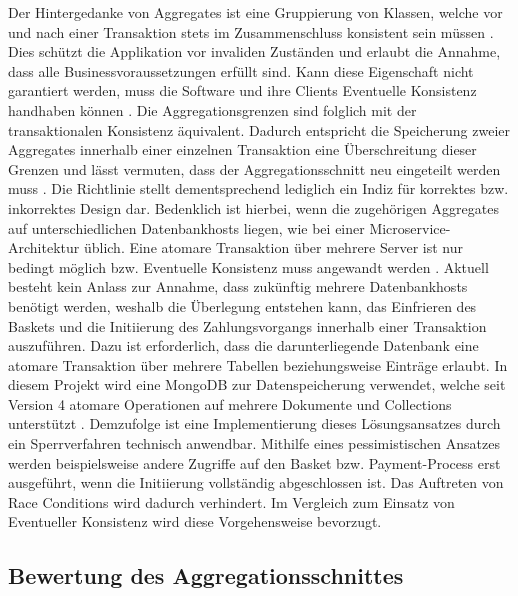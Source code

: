 Der Hintergedanke von Aggregates ist eine Gruppierung von Klassen, welche vor und nach einer Transaktion stets im Zusammenschluss konsistent sein müssen \cite[S. 128f.]{Evans.2011}. Dies schützt die Applikation vor invaliden Zuständen und erlaubt die Annahme, dass alle Businessvoraussetzungen erfüllt sind. Kann diese Eigenschaft nicht garantiert werden, muss die Software und ihre Clients Eventuelle Konsistenz handhaben können \cite[S. 364]{Vernon.2015}. Die Aggregationsgrenzen sind folglich mit der transaktionalen Konsistenz äquivalent. Dadurch entspricht die Speicherung zweier Aggregates innerhalb einer einzelnen Transaktion eine Überschreitung dieser Grenzen und lässt vermuten, dass der Aggregationsschnitt neu eingeteilt werden muss \cite[S. 358f.]{Vernon.2015}. Die Richtlinie stellt dementsprechend lediglich ein Indiz für korrektes bzw. inkorrektes Design dar. Bedenklich ist hierbei, wenn die zugehörigen Aggregates auf unterschiedlichen Datenbankhosts liegen, wie bei einer Microservice-Architektur üblich. Eine atomare Transaktion über mehrere Server ist nur bedingt möglich bzw. Eventuelle Konsistenz muss angewandt werden \cite{Fowler.2014}. Aktuell besteht kein Anlass zur Annahme, dass zukünftig mehrere Datenbankhosts benötigt werden, weshalb die Überlegung entstehen kann, das Einfrieren des Baskets und die Initiierung des Zahlungsvorgangs innerhalb einer Transaktion auszuführen. Dazu ist erforderlich, dass die darunterliegende Datenbank eine atomare Transaktion über mehrere Tabellen beziehungsweise Einträge erlaubt. In diesem Projekt wird eine MongoDB zur Datenspeicherung verwendet, welche seit Version 4 atomare Operationen auf mehrere Dokumente und Collections unterstützt \cite{mongodb.atomicity}. Demzufolge ist eine Implementierung dieses Lösungsansatzes durch ein Sperrverfahren technisch anwendbar. Mithilfe eines pessimistischen Ansatzes werden beispielsweise andere Zugriffe auf den Basket bzw. Payment-Process erst ausgeführt, wenn die Initiierung vollständig abgeschlossen ist. Das Auftreten von Race Conditions wird dadurch verhindert. \cite{Graefe.2016} Im Vergleich zum Einsatz von Eventueller Konsistenz wird diese Vorgehensweise bevorzugt.

\subsection{Bewertung des Aggregationsschnittes}

